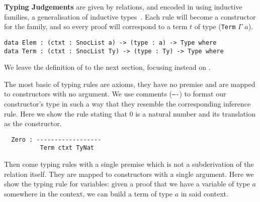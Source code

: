 
\textbf{Typing Judgements} are given by relations, and encoded in
\Idris{} using inductive families, a generalisation of inductive
types~\cite{DBLP:journals/fac/Dybjer94}.
%
Each rule will become a constructor for the family, and so every
proof \inferenceRule{} will correspond to a term $t$ of type
(\texttt{Term} $\Gamma$ $a$).

\begin{center}
\begin{minipage}{0.10\textwidth}
\varRule
\inferenceRule
\end{minipage}\hfill
\begin{minipage}{0.80\textwidth}
\begin{Verbatim}
data Elem : (ctxt : SnocList a) -> (type : a) -> Type where
data Term : (ctxt : SnocList Ty) -> (type : Ty) -> Type where
\end{Verbatim}
\end{minipage}
\end{center}

We leave the definition of  to the next section,
focusing instead on .

The most basic of typing rules are axioms, they have no premise
and are mapped to constructors with no argument.
We use \Idris{} comments (\texttt{----}) to format our constructor's type in such
a way that they resemble the corresponding inference rule.
%
Here we show the rule stating that $0$ is a natural number and
its translation as the  constructor.

\begin{center}
\begin{minipage}{0.45\textwidth}
\inferenceZero
\end{minipage}\hfill
\begin{minipage}{0.45\textwidth}
\begin{Verbatim}
  Zero : ------------------
          Term ctxt TyNat
\end{Verbatim}
\end{minipage}
\end{center}

Then come typing rules with a single premise which is not a subderivation
of the relation itself.
They are mapped to constructors with a single argument.
%
Here we show the typing rule for variables: given a proof that we have a
variable of type $a$ somewhere in the context, we can build a term of type
$a$ in said context.

